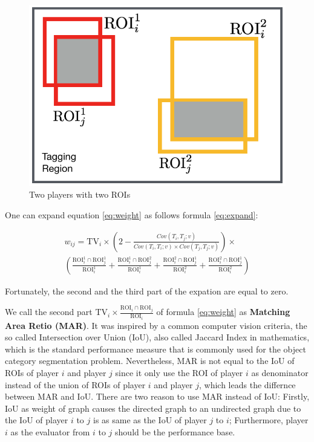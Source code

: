   \begin{figure}[htp]
  \centering
  \includegraphics[width=0.5\columnwidth]{figures/performance}
  \caption{Two players with two ROIs}
  \label{fig:performance}
  \end{figure}

  One can expand equation \ref{eq:weight} as follows formula \ref{eq:expand}:

  \begin{multline}
  \label{eq:expand}
  w_{ij} = \text{TV}_i \times \left(2-\frac{Cov(T_i, T_j; v)}{Cov(T_i, T_i; v)\times Cov(T_j, T_j; v)}\right) \times \\
    \left( \frac{\text{ROI}_i^1\cap\text{ROI}_j^1}{\text{ROI}_i^1}           
    + \frac{\text{ROI}_i^1\cap\text{ROI}_j^2}{\text{ROI}_i^1}           
    + \frac{\text{ROI}_i^2\cap\text{ROI}_j^1}{\text{ROI}_i^2}           
    + \frac{\text{ROI}_i^2\cap\text{ROI}_j^1}{\text{ROI}_i^2} \right)
  \end{multline}

  Fortunately, the second and the third part of the expation are equal to zero.

  We call the second part $\text{TV}_i \times \frac{\text{ROI}_i\cap\text{ROI}_j}{\text{ROI}_i}$ 
  of formula \ref{eq:weight} as \textbf{Matching Area Retio (MAR)}. 
  It was inspired by a common computer vision criteria,
  the so called Intersection over Union (IoU), also called Jaccard Index in mathematics\cite{real1996probabilistic},
  which is the standard performance measure that is commonly used for the object category segmentation problem.
  Nevertheless, MAR is not equal to the IoU of ROIs of player $i$  and player $j$ since
  it only use the ROI of player $i$ as denominator instead of the union of ROIs of player $i$ and player $j$,
  which leads the differnce between MAR and IoU. There are two reason to use MAR instead of IoU:
  Firstly, IoU as weight of graph causes the directed graph to an undirected graph due to the IoU of player $i$ to $j$
  is as same as the IoU of player $j$ to $i$; Furthermore, player $i$ as the evaluator from $i$ to $j$ 
  should be the performance base.

